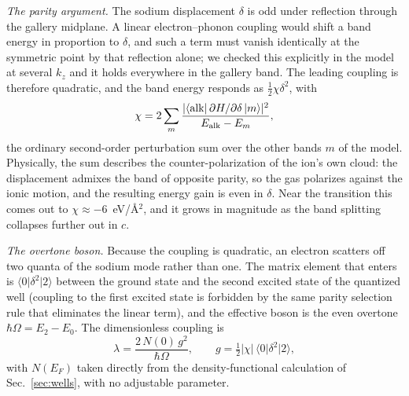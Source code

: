 \documentclass[aps,10pt,preprint,superscriptaddress,floatfix]{revtex4-2}
\begin{document}
\emph{The parity argument.} The sodium displacement $\delta$ is odd under reflection through the
gallery midplane. A linear electron--phonon coupling would shift a band energy in proportion to
$\delta$, and such a term must vanish identically at the symmetric point by that reflection alone;
we checked this explicitly in the model at several $k_z$ and it holds everywhere in the gallery
band. The leading coupling is therefore quadratic, and the band energy responds as
$\tfrac12\chi\delta^2$, with
\begin{equation}
  \chi = 2\sum_m \frac{\lvert\langle {\rm alk}\lvert\,\partial H/\partial\delta\,\rvert m\rangle\rvert^2}
                       {E_{\rm alk}-E_m},
  \label{eq:chi}
\end{equation}
the ordinary second-order perturbation sum over the other bands $m$ of the model. Physically, the
sum describes the counter-polarization of the ion's own cloud: the displacement admixes the band
of opposite parity, so the gas polarizes against the ionic motion, and the resulting energy gain
is even in $\delta$. Near the
transition this comes out to $\chi\approx-6$~eV/\AA$^2$, and it grows in magnitude as the band
splitting collapses further out in $c$.

\emph{The overtone boson.} Because the coupling is quadratic, an electron scatters off two quanta
of the sodium mode rather than one. The matrix element that enters is
$\langle0\lvert\delta^2\rvert2\rangle$ between the ground state and the second excited state of the
quantized well (coupling to the first excited state is forbidden by the same parity selection rule
that eliminates the linear term), and the effective boson is the even overtone
$\hbar\Omega=E_2-E_0$. The dimensionless
coupling is
\begin{equation}
  \lambda = \frac{2\,N(0)\,g^2}{\hbar\Omega}, \qquad
  g = \tfrac12\lvert\chi\rvert\,\langle0\lvert\delta^2\rvert2\rangle,
  \label{eq:lambda}
\end{equation}
with $N(E_F)$ taken directly from the density-functional calculation of Sec.~\ref{sec:wells}, with
no adjustable parameter.
\end{document}

